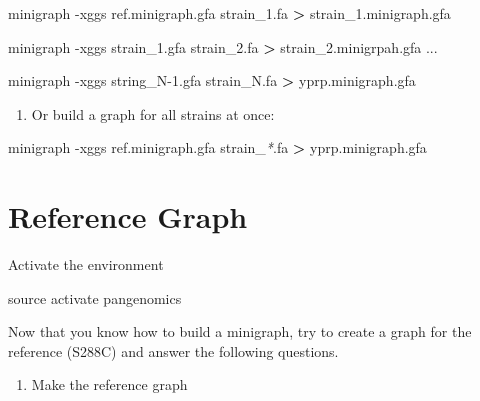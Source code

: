 \documentclass[
]{book}
\newenvironment{Shaded}{\begin{snugshade}}{\end{snugshade}}
\newcommand{\AttributeTok}[1]{\textcolor[rgb]{0.77,0.63,0.00}{#1}}
\newcommand{\BuiltInTok}[1]{#1}
\newcommand{\ExtensionTok}[1]{#1}
\newcommand{\NormalTok}[1]{#1}
\newcommand{\OperatorTok}[1]{\textcolor[rgb]{0.81,0.36,0.00}{\textbf{#1}}}
\newcommand{\PreprocessorTok}[1]{\textcolor[rgb]{0.56,0.35,0.01}{\textit{#1}}}
\providecommand{\tightlist}{%
  \setlength{\itemsep}{0pt}\setlength{\parskip}{0pt}}
\begin{document}
\begin{Shaded}
\begin{Highlighting}[]
\ExtensionTok{minigraph} \AttributeTok{{-}xggs}\NormalTok{ ref.minigraph.gfa strain\_1.fa }\OperatorTok{\textgreater{}}\NormalTok{ strain\_1.minigraph.gfa}

\ExtensionTok{minigraph} \AttributeTok{{-}xggs}\NormalTok{ strain\_1.gfa strain\_2.fa }\OperatorTok{\textgreater{}}\NormalTok{ strain\_2.minigrpah.gfa}
\ExtensionTok{...}

\ExtensionTok{minigraph} \AttributeTok{{-}xggs}\NormalTok{ string\_N{-}1.gfa strain\_N.fa }\OperatorTok{\textgreater{}}\NormalTok{ yprp.minigraph.gfa}
\end{Highlighting}
\end{Shaded}

\begin{enumerate}
\def\labelenumi{\arabic{enumi}.}
\setcounter{enumi}{2}
\tightlist
\item
  Or build a graph for all strains at once:
\end{enumerate}

\begin{Shaded}
\begin{Highlighting}[]
\ExtensionTok{minigraph} \AttributeTok{{-}xggs}\NormalTok{ ref.minigraph.gfa strain\_}\PreprocessorTok{*}\NormalTok{.fa }\OperatorTok{\textgreater{}}\NormalTok{ yprp.minigraph.gfa}
\end{Highlighting}
\end{Shaded}

\hypertarget{reference-graph}{%
\section{Reference Graph}\label{reference-graph}}

Activate the environment

\begin{Shaded}
\begin{Highlighting}[]
\BuiltInTok{source}\NormalTok{ activate pangenomics}
\end{Highlighting}
\end{Shaded}

Now that you know how to build a minigraph, try to create a graph for the reference (S288C) and answer the following questions.

\begin{enumerate}
\def\labelenumi{\arabic{enumi}.}
\tightlist
\item
  Make the reference graph
\end{enumerate}
\end{document}
